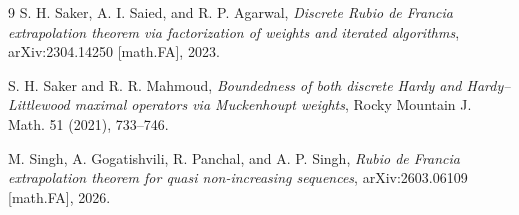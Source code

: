 \documentclass[11pt]{article}
\begin{document}
\begin{thebibliography}{9}
S. H. Saker, A. I. Saied, and R. P. Agarwal,
\emph{Discrete Rubio de Francia extrapolation theorem via factorization of
weights and iterated algorithms}, arXiv:2304.14250 [math.FA], 2023.

S. H. Saker and R. R. Mahmoud,
\emph{Boundedness of both discrete Hardy and Hardy--Littlewood maximal
operators via Muckenhoupt weights}, Rocky Mountain J. Math. 51 (2021),
733--746.

M. Singh, A. Gogatishvili, R. Panchal, and A. P. Singh,
\emph{Rubio de Francia extrapolation theorem for quasi non-increasing
sequences}, arXiv:2603.06109 [math.FA], 2026.
\end{thebibliography}
\end{document}
